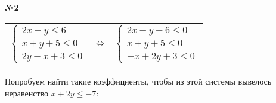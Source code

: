 \documentclass{article}
\newenvironment{task}{\begin{center}\fontsize{14}{14}\selectfont\bf}{\rm\fontsize{12}{12}\selectfont\end{center}}
\begin{document}

	\begin{task} 
		№2
	\end{task}
	\begin{center}
		\begin{tabular}{ccc}
			$\begin{cases}
			2x-y \leq 6 \\
			x+y+5 \leq 0 \\
			2y-x+3 \leq 0
			\end{cases}$
			& $\hfill \Leftrightarrow \hfill$ &
			$\begin{cases}
			2x-y-6 \leq 0 \\
			x+y+5 \leq 0 \\
			-x+2y+3 \leq 0
			\end{cases}$
		\end{tabular}
	\end{center}
	Попробуем найти такие коэффициенты, чтобы из этой системы вывелось неравенство $x+2y\leq-7$:\\
\end{document}
